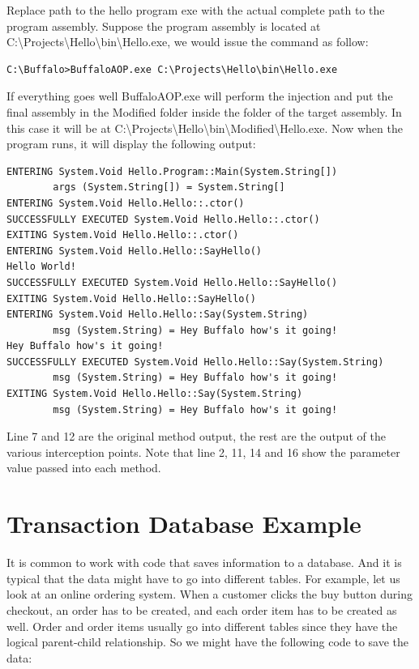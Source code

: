 Replace path to the hello program exe with the actual complete path to the program assembly. Suppose the program assembly is located at C:\textbackslash{Projects}\textbackslash{Hello}\textbackslash{bin}\textbackslash{Hello.exe}, we would issue the command as follow:

\begin{lstlisting}[caption={Invoking BuffaloAOP.exe Example}, label=buffalocmd2, frame=tb, basicstyle=\scriptsize]
C:\Buffalo>BuffaloAOP.exe C:\Projects\Hello\bin\Hello.exe
\end{lstlisting}

If everything goes well BuffaloAOP.exe will perform the injection and put the final assembly in the Modified folder inside the folder of the target assembly. In this case it will be at C:\textbackslash{Projects}\textbackslash{Hello}\textbackslash{bin}\textbackslash{Modified}\textbackslash{Hello.exe}. Now when the program runs, it will display the following output:

\begin{lstlisting}[caption={TraceAspect output}, label=traceaspectout, frame=tb, basicstyle=\scriptsize]
ENTERING System.Void Hello.Program::Main(System.String[])
        args (System.String[]) = System.String[]
ENTERING System.Void Hello.Hello::.ctor()
SUCCESSFULLY EXECUTED System.Void Hello.Hello::.ctor()
EXITING System.Void Hello.Hello::.ctor()
ENTERING System.Void Hello.Hello::SayHello()
Hello World!
SUCCESSFULLY EXECUTED System.Void Hello.Hello::SayHello()
EXITING System.Void Hello.Hello::SayHello()
ENTERING System.Void Hello.Hello::Say(System.String)
        msg (System.String) = Hey Buffalo how's it going!
Hey Buffalo how's it going!
SUCCESSFULLY EXECUTED System.Void Hello.Hello::Say(System.String)
        msg (System.String) = Hey Buffalo how's it going!
EXITING System.Void Hello.Hello::Say(System.String)
        msg (System.String) = Hey Buffalo how's it going!
\end{lstlisting}

Line 7 and 12 are the original method output, the rest are the output of the various interception points. Note that line 2, 11, 14 and 16 show the parameter value passed into each method.

\section{Transaction Database Example}

It is common to work with code that saves information to a database. And it is typical that the data might have to go into different tables. For example, let us look at an online ordering system. When a customer clicks the buy button during checkout, an order has to be created, and each order item has to be created as well. Order and order items usually go into different tables since they have the logical parent-child relationship. So we might have the following code to save the data:

